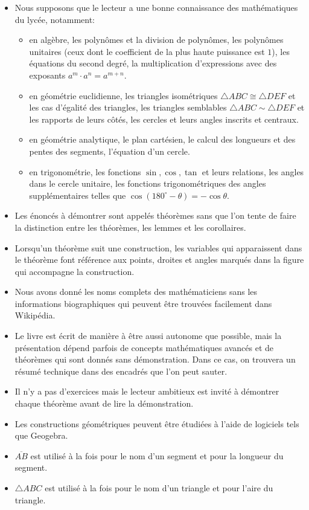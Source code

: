 \begin{itemize}
\item Nous supposons que le lecteur a une bonne connaissance des mathématiques du lycée, notamment: 
\begin{itemize}
\item en algèbre, les polynômes et la division de polynômes, les polynômes {unitaires} (ceux dont le coefficient de la plus haute puissance est $1$), les équations du second degré, la multiplication d'expressions avec des exposants $a^m\cdot a^n=a^{m+n}$.
\item en géométrie euclidienne, les  triangles isométriques  $\triangle ABC \cong \triangle DEF$ et les cas d'égalité des triangles, les triangles semblables $\triangle ABC \sim \triangle DEF$ et les rapports de leurs côtés, les cercles et leurs angles inscrits et centraux.
\item en géométrie analytique, le plan cartésien, le calcul des longueurs et des pentes des segments, l'équation d'un cercle.
\item en trigonométrie, les fonctions $\sin,\cos,\tan$ et leurs relations, les angles dans le cercle unitaire, les fonctions trigonométriques des angles supplémentaires telles que $\cos (180^\circ-\theta)=-\cos\theta$.
\end{itemize}
\item Les énoncés à démontrer sont appelés \og théorèmes\fg{} sans que l'on tente de faire la distinction entre les théorèmes, les lemmes et les corollaires.
\item Lorsqu'un théorème suit une construction, les variables qui apparaissent dans le théorème font référence aux points, droites et angles marqués dans la figure qui accompagne la construction.
\item Nous avons donné les noms complets des mathématiciens sans les informations biographiques qui peuvent être trouvées facilement dans Wikipédia.
\item Le livre est écrit de manière à être aussi autonome que possible, mais la présentation dépend parfois de concepts mathématiques avancés et de théorèmes qui sont donnés sans démonstration. Dans ce cas, on trouvera un résumé technique dans des encadrés que l'on peut sauter.
\item Il n'y a pas d'exercices mais le lecteur ambitieux est invité à démontrer chaque théorème avant de lire la démonstration.
\item Les constructions géométriques peuvent être étudiées à l'aide de logiciels tels que {Geogebra}.
\item  $\overline{AB}$ est utilisé à la fois pour le nom d'un segment  et pour la longueur du segment.
\item $\triangle ABC$ est utilisé à la fois pour le nom d'un triangle et pour l'aire du triangle.
\end{itemize}



